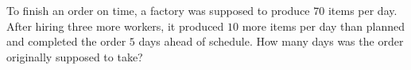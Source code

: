To finish an order on time, a factory was supposed to produce $70$ items per day. After hiring three more workers, it produced $10$ more items per day than planned and completed the order $5$ days ahead of schedule. How many days was the order originally supposed to take?

